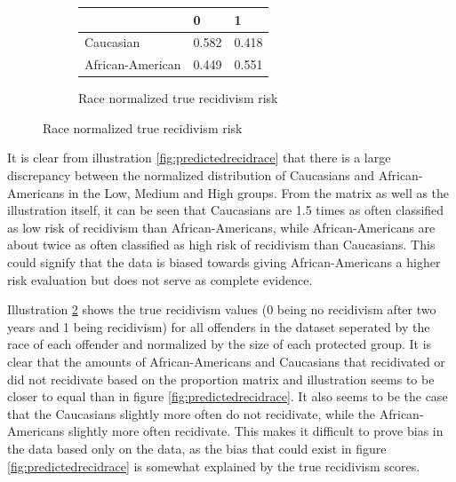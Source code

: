 \documentclass[11pt, fleqn, titlepage]{article}
\begin{document}
\begin{figure}[H]
\begin{subfigure}{0.5\textwidth}
			\begin{table}[H]
				\centering
				\begin{tabular}{|l|l|l|}
					\hline
					& 0   & 1  \\ \hline
					Caucasian        & 0.582 & 0.418  \\ \hline
					African-American & 0.449 & 0.551  \\ \hline
				\end{tabular}
			\end{table}	
			\caption{Race normalized true recidivism risk}\label{fig:race_truerecid}
		\end{subfigure}
	\end{figure}

\noindent It is clear from illustration \ref{fig:predictedrecidrace} that there is a large discrepancy between the normalized distribution of Caucasians and African-Americans in the Low, Medium and High groups. From the matrix as well as the illustration itself, it can be seen that Caucasians are 1.5 times as often classified as low risk of recidivism than African-Americans, while African-Americans are about twice as often classified as high risk of recidivism than Caucasians. This could signify that the data is biased towards giving African-Americans a higher risk evaluation but does not serve as complete evidence. 

Illustration \ref{fig:race_truerecid} shows the true recidivism values (0 being no recidivism after two years and 1 being recidivism) for all offenders in the dataset seperated by the race of each offender and normalized by the size of each protected group. It is clear that the amounts of African-Americans and Caucasians that recidivated or did not recidivate based on the proportion matrix and illustration seems to be closer to equal than in figure \ref{fig:predictedrecidrace}. It also seems to be the case that the Caucasians slightly more often do not recidivate, while the African-Americans slightly more often recidivate. This makes it difficult to prove bias in the data based only on the data, as the bias that could exist in figure \ref{fig:predictedrecidrace} is somewhat explained by the true recidivism scores.
\end{document}
